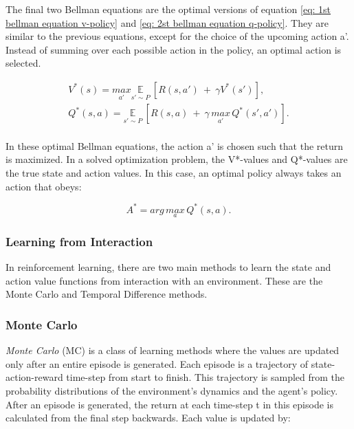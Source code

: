 The final two Bellman equations are the optimal versions of equation \ref{eq: 1st bellman equation v-policy} and \ref{eq: 2st bellman equation q-policy}. They are similar to the previous equations, except for the choice of the upcoming action a'. Instead of summing over each possible action in the policy, an optimal action is selected.



\begin{gather}
    \label{eq: 3rd bellman equation v-optimal}
    V^*(s) = \underset{a'}{max} \underset{s' \sim P}{\mathbb{E}} \ [R(s,a')\ +\ \gamma V^*(s')], \\ 
    Q^*(s,a) =  \underset{s' \sim P}{\mathbb{E}} \ [R(s,a)\ +\ \gamma \, \underset{a'}{max} \, Q^*(s',a')].
    \label{eq: 4rd bellman equation q-optimal}
\end{gather}
\\[-2mm]
\noindent
In these optimal Bellman equations, the action a' is chosen such that the return is maximized. In a solved optimization problem, the V*-values and Q*-values are the true state and action values. In this case, an optimal policy always takes an action that obeys:

\begin{equation}
    A^* = arg\, \underset{a}{max} \, Q^*(s,a).
\end{equation}


\newpage












\subsubsection{Learning from Interaction}

In reinforcement learning, there are two main methods to learn the state and action value functions from interaction with an environment. These are the Monte Carlo and Temporal Difference methods. 

\subsubsection*{Monte Carlo}

\textit{Monte Carlo} (MC) is a class of learning methods where the values are updated only after an entire episode is generated. Each episode is a trajectory of state-action-reward time-step from start to finish. This trajectory is sampled from the probability distributions of the environment's dynamics and the agent's policy. After an episode is generated, the return at each time-step t in this episode is calculated from the final step backwards. Each value is updated by:

